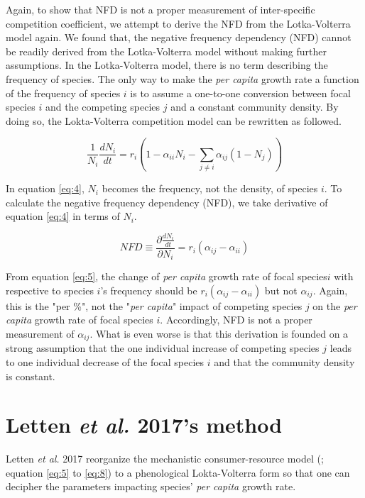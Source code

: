 \documentclass[fleqn]{article}
\begin{document}
Again, to show that NFD is not a proper measurement of inter-specific competition coefficient, we attempt to derive the NFD from the Lotka-Volterra model again. We found that, the negative frequency dependency (NFD) cannot be readily derived from the Lotka-Volterra model without making further assumptions. In the Lotka-Volterra model, there is no term describing the frequency of species. The only way to make the \textit{per capita} growth rate a function of the frequency of species $i$ is to assume a one-to-one conversion between focal species $i$ and the competing species $j$ and a constant community density. By doing so, the Lokta-Volterra competition model can be rewritten as followed. 

\begin{equation}\label{eq:4}
 \frac{1}{N_i}\frac{dN_i}{dt} = r_i(1 - \alpha_{ii}N_i - \sum_{j \neq i}^{} \alpha_{ij}(1-N_j))
\end{equation}

In equation \ref{eq:4}, $N_i$ becomes the frequency, not the density, of species $i$. To calculate the negative frequency dependency (NFD), we take derivative of equation \ref{eq:4} in terms of $N_i$. 

\begin{equation}\label{eq:5}
 NFD \equiv \frac{\partial \frac{dN_i}{dt}}{\partial N_i} = r_i(\alpha_{ij} - \alpha_{ii})
\end{equation}

\noindent From equation \ref{eq:5}, the change of \textit{per capita} growth rate of focal species$i$ with respective to species $i$'s frequency should be $r_i(\alpha_{ij} - \alpha_{ii})$ but not $\alpha_{ij}$. Again, this is the "per \%", not the "\textit{per capita}" impact of competing species $j$ on the \textit{per capita} growth rate of focal species $i$. Accordingly, NFD is not a proper measurement of $\alpha_{ij}$. What is even worse is that this derivation is founded on a strong assumption that the one individual increase of competing species $j$ leads to one individual decrease of the focal species $i$ and that the community density is constant. 


\newpage
\section{Letten \textit{et al.} 2017's method}

Letten \textit{et al.} 2017 reorganize the mechanistic consumer-resource model (\cite{Tilman1977}; equation \ref{eq:5} to \ref{eq:8}) to a phenological Lokta-Volterra form so that one can decipher the parameters impacting species' \textit{per capita} growth rate. 
\end{document}
